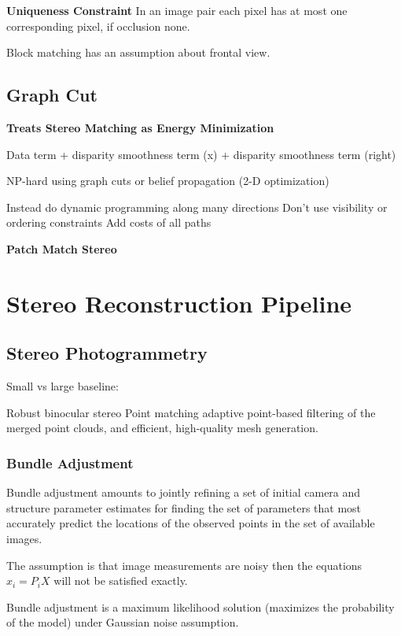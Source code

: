 \textbf{Uniqueness Constraint} 
In an image pair each pixel has at most one corresponding pixel, if occlusion none.

Block matching has an assumption about frontal view.

\subsection{Graph Cut}


\textbf{Treats Stereo Matching as Energy Minimization}

Data term + disparity smoothness term (x) + disparity smoothness term (right)

NP-hard using graph cuts or belief propagation (2-D optimization)

Instead do dynamic programming along many directions
Don’t use visibility or ordering constraints
Add costs of all paths

\textbf{Patch Match Stereo}

\section{Stereo Reconstruction Pipeline}

\subsection{Stereo Photogrammetry}

Small vs large baseline:

Robust binocular stereo
Point matching
adaptive point-based filtering of the merged point clouds, and efficient, high-quality mesh generation.

\subsubsection{Bundle Adjustment}

Bundle adjustment amounts to jointly refining a set of initial camera and structure parameter estimates for finding the set of parameters that most accurately predict the locations of the observed points in the set of available images. 

The assumption is that image measurements are noisy then the equations $x_i = P_i X$ will not be satisfied exactly. 

Bundle adjustment is a maximum likelihood solution (maximizes the probability of the model) under Gaussian  noise assumption. 

